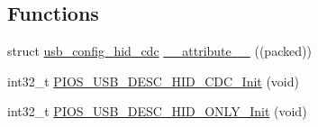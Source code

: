 \subsection*{\-Functions}
\begin{DoxyCompactItemize}
\item 
struct \hyperlink{structusb__config__hid__cdc}{usb\-\_\-config\-\_\-hid\-\_\-cdc} \hyperlink{group___p_i_o_s___u_s_b___d_e_s_c_ga6fb0c6d6cc5e1170eef958ceaf306a50}{\-\_\-\-\_\-attribute\-\_\-\-\_\-} ((packed))
\item 
int32\-\_\-t \hyperlink{group___p_i_o_s___u_s_b___d_e_s_c_ga15a9a7a662d2bce8263b132b33753d75}{\-P\-I\-O\-S\-\_\-\-U\-S\-B\-\_\-\-D\-E\-S\-C\-\_\-\-H\-I\-D\-\_\-\-C\-D\-C\-\_\-\-Init} (void)
\item 
int32\-\_\-t \hyperlink{group___p_i_o_s___u_s_b___d_e_s_c_ga92ea05b354edae76dd1315a1e389d506}{\-P\-I\-O\-S\-\_\-\-U\-S\-B\-\_\-\-D\-E\-S\-C\-\_\-\-H\-I\-D\-\_\-\-O\-N\-L\-Y\-\_\-\-Init} (void)
\end{DoxyCompactItemize}

